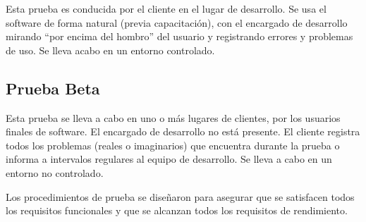 		Esta prueba es conducida por el cliente en el lugar de desarrollo. Se usa el software de forma natural (previa capacitación), con el encargado de desarrollo mirando “por encima del hombro” del usuario y registrando errores y problemas de uso. Se lleva acabo en un entorno controlado.
		
	\subsection{Prueba Beta}

		Esta prueba se lleva a cabo en uno o más lugares de clientes, por los usuarios finales de software. El encargado de desarrollo no está presente. El cliente registra todos los problemas (reales o imaginarios) que  encuentra durante la prueba o informa a intervalos regulares al equipo de desarrollo. Se lleva a cabo en un entorno no controlado.

		Los procedimientos de prueba se diseñaron para asegurar que se satisfacen todos los requisitos funcionales y que se alcanzan todos los requisitos de rendimiento.